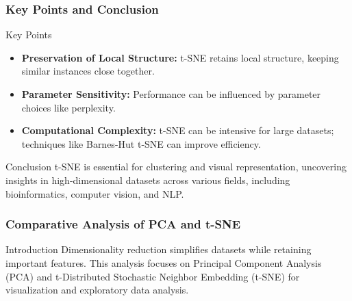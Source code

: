 \documentclass[aspectratio=169]{beamer}
\begin{document}
\begin{frame}[fragile]
    \frametitle{Key Points and Conclusion}
    \begin{block}{Key Points}
        \begin{itemize}
            \item \textbf{Preservation of Local Structure:} t-SNE retains local structure, keeping similar instances close together.
            \item \textbf{Parameter Sensitivity:} Performance can be influenced by parameter choices like perplexity.
            \item \textbf{Computational Complexity:} t-SNE can be intensive for large datasets; techniques like Barnes-Hut t-SNE can improve efficiency.
        \end{itemize}
    \end{block}
    
    \begin{block}{Conclusion}
        t-SNE is essential for clustering and visual representation, uncovering insights in high-dimensional datasets across various fields, including bioinformatics, computer vision, and NLP.
    \end{block}
\end{frame}

\begin{frame}[fragile]
    \frametitle{Comparative Analysis of PCA and t-SNE}
    
    \begin{block}{Introduction}
        Dimensionality reduction simplifies datasets while retaining important features. This analysis focuses on Principal Component Analysis (PCA) and t-Distributed Stochastic Neighbor Embedding (t-SNE) for visualization and exploratory data analysis.
    \end{block}
\end{frame}
\end{document}
